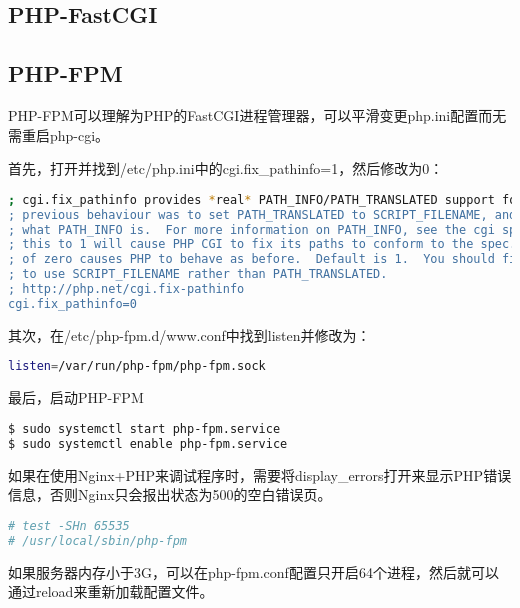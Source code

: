 \subsection{PHP-FastCGI}


\subsection{PHP-FPM}


PHP-FPM可以理解为PHP的FastCGI进程管理器，可以平滑变更php.ini配置而无需重启php-cgi。

首先，打开并找到/etc/php.ini中的cgi.fix\_pathinfo=1，然后修改为0：


\begin{lstlisting}[language=bash]
; cgi.fix_pathinfo provides *real* PATH_INFO/PATH_TRANSLATED support for CGI.  PHP's
; previous behaviour was to set PATH_TRANSLATED to SCRIPT_FILENAME, and to not grok
; what PATH_INFO is.  For more information on PATH_INFO, see the cgi specs.  Setting
; this to 1 will cause PHP CGI to fix its paths to conform to the spec.  A setting
; of zero causes PHP to behave as before.  Default is 1.  You should fix your scripts
; to use SCRIPT_FILENAME rather than PATH_TRANSLATED.
; http://php.net/cgi.fix-pathinfo
cgi.fix_pathinfo=0
\end{lstlisting}


其次，在/etc/php-fpm.d/www.conf中找到listen并修改为：



\begin{lstlisting}[language=bash]
listen=/var/run/php-fpm/php-fpm.sock
\end{lstlisting}


最后，启动PHP-FPM



\begin{lstlisting}[language=bash]
$ sudo systemctl start php-fpm.service
$ sudo systemctl enable php-fpm.service
\end{lstlisting}


如果在使用Nginx+PHP来调试程序时，需要将display\_errors打开来显示PHP错误信息，否则Nginx只会报出状态为500的空白错误页。

\begin{lstlisting}[language=bash]
# test -SHn 65535
# /usr/local/sbin/php-fpm
\end{lstlisting}

如果服务器内存小于3G，可以在php-fpm.conf配置只开启64个进程，然后就可以通过reload来重新加载配置文件。

